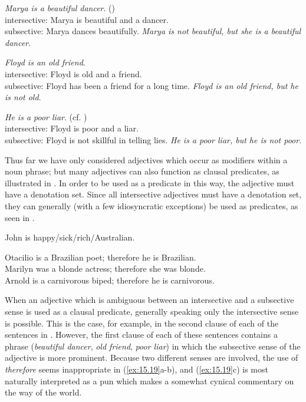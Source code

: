 \ea \label{ex:15.14}
\ea   \textit{Marya is a beautiful dancer}.  \hfill  (\citealt{Siegel1976})\\
intersective: Marya is beautiful and a dancer.\\
subsective: Marya dances beautifully.
\ex  \textit{Marya is not beautiful, but she is a beautiful dancer}.
\z \z

\ea \label{ex:15.15}
\ea  \textit{Floyd is an old friend}. \\
intersective: Floyd is old and a friend.\\
subsective: Floyd has been a friend for a long time.
\ex  \textit{Floyd is an old friend, but he is not old}.
\z \z

\ea \label{ex:15.16}
\ea   \textit{He is a poor liar}.  \hfill (cf. \citealt{Bolinger1967})\\
intersective: Floyd is poor and a liar.\\
subsective: Floyd is not skillful in telling lies.
\ex  \textit{He is a poor liar, but he is not poor}.
\z \z


Thus far we have only considered adjectives which occur as modifiers within a noun phrase; but many adjectives can also function as clausal predicates, as illustrated in . In order to be used as a predicate in this way, the adjective must have a denotation set. Since all intersective adjectives must have a denotation set, they can generally (with a few idiosyncratic exceptions) be used as predicates, as seen in .


\ea \label{ex:15.17}
John is happy/sick/rich/{Australian}.
\z

\ea \label{ex:15.18}
\ea  Otacilio is a {Brazilian} poet; therefore he is {Brazilian}.\\
\ex Marilyn was a blonde actress; therefore she was blonde.\\
\ex Arnold is a carnivorous biped; therefore he is carnivorous.
                       \z
\z


When an adjective which is ambiguous between an intersective and a subsective sense is used as a clausal predicate, generally speaking only the intersective sense is possible. This is the case, for example, in the second clause of each of the sentences in . However, the first clause of each of these sentences contains a phrase (\textit{beautiful dancer}, \textit{old friend}, \textit{poor liar}) in which the subsective sense of the adjective is more prominent. Because two different senses are involved, the use of \textit{therefore} seems inappropriate in (\ref{ex:15.19}a-b), and (\ref{ex:15.19}c) is most naturally interpreted as a pun which makes a somewhat cynical commentary on the way of the world.


